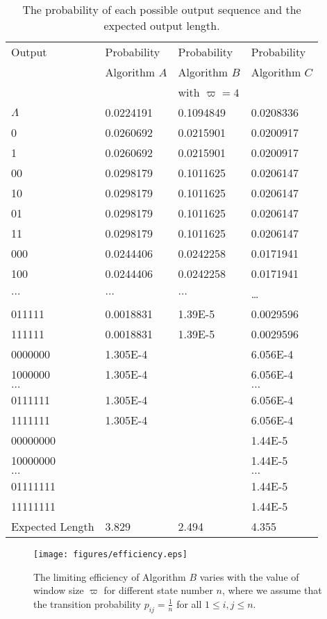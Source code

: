 \documentclass[journal]{IEEEtran}
\begin{document}
\begin{table}
  \centering
  \begin{tabular}{llll}
  \hline
  Output &  Probability  & Probability  & Probability  \\
  & Algorithm $A$ & Algorithm $B$ & Algorithm $C$ \\
  &&with $\varpi=4$&\\
  \hline
  $\Lambda$ & 0.0224191  & 0.1094849& 0.0208336\\
  0 &0.0260692   & 0.0215901& 0.0200917\\
  1 & 0.0260692  & 0.0215901&0.0200917 \\
  00 & 0.0298179 & 0.1011625&0.0206147\\
  10 & 0.0298179& 0.1011625& 0.0206147\\
  01 & 0.0298179 &0.1011625& 0.0206147\\
  11 & 0.0298179 & 0.1011625&0.0206147\\
  000 & 0.0244406 & 0.0242258& 0.0171941\\
  100 & 0.0244406& 0.0242258& 0.0171941\\
  $\ldots$ & $\ldots$& $\ldots$ & \ldots\\
011111 &0.0018831  &1.39E-5& 0.0029596\\
111111 & 0.0018831 &1.39E-5& 0.0029596\\
0000000 & 1.305E-4& & 6.056E-4\\
1000000 & 1.305E-4& &6.056E-4\\
$\ldots$ & && $\ldots$ \\
0111111 & 1.305E-4 && 6.056E-4\\
1111111 & 1.305E-4 && 6.056E-4\\
00000000 & & &1.44E-5\\
10000000 & &&1.44E-5 \\
$\ldots$ & && $\ldots$ \\
01111111&  &&  1.44E-5\\
11111111&  & &  1.44E-5\\
  \hline
Expected Length& 3.829  & 2.494& 4.355\\
\hline
\end{tabular}
  \caption{The probability of each possible output sequence and the expected output length.
  }\label{Table1}
\end{table}

\begin{figure}[!h]
\centering
\texttt{[image: figures/efficiency.eps]}
\caption{The limiting efficiency of Algorithm $B$ varies with the value of window size $\varpi$ for different state number $n$, where we assume
that the transition probability $p_{ij}=\frac{1}{n}$ for all $1\leq i,j\leq n$.}
\label{fig_effiency}
\end{figure}
\end{document}
